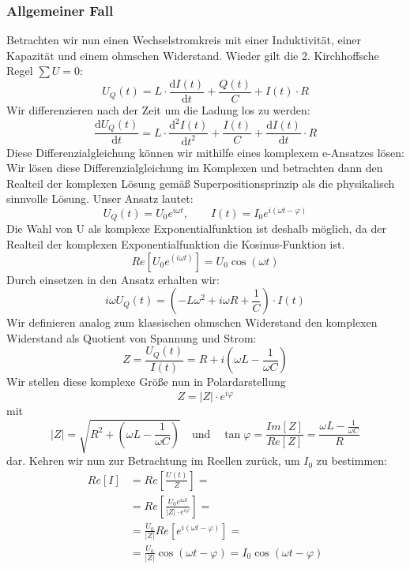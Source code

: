 \subsubsection{Allgemeiner Fall}
Betrachten wir nun einen Wechselstromkreis mit einer Induktivität, einer Kapazität und einem ohmschen Widerstand. Wieder gilt die 2. Kirchhoffsche Regel $\sum U = 0$:
\begin{equation}
U_Q(t) = L \cdot \frac{\mathrm{d}I(t)}{\mathrm{d}t} + \frac{Q(t)}{C} + I(t) \cdot R
\end{equation}
Wir differenzieren nach der Zeit um die Ladung los zu werden:
\begin{equation}
\frac{\mathrm dU_Q(t)}{\mathrm dt} = L \cdot \frac{\mathrm{d^2}I(t)}{\mathrm{d}t^2} + \frac{I(t)}{C} + \frac{\mathrm dI(t)}{\mathrm dt} \cdot R
\end{equation}
Diese Differenzialgleichung können wir mithilfe eines komplexem e-Ansatzes lösen:
Wir lösen diese Differenzialgleichung im Komplexen und betrachten dann den Realteil der komplexen Lösung gemäß Superpositionsprinzip als die physikalisch sinnvolle Lösung. Unser Ansatz lautet:
\begin{equation}
U_Q(t) = U_0 e^{i\omega t},	\qquad	I(t) = I_0 e^{i(\omega t-\varphi)}
\end{equation}
Die Wahl von U als komplexe Exponentialfunktion ist deshalb möglich, da der Realteil der komplexen Exponentialfunktion die Kosinus-Funktion ist.
\begin{equation}
Re\left[ U_0 e^{(i\omega t)}\right]  = U_0 \cos{(\omega t)}
\end{equation}
Durch einsetzen in den Ansatz erhalten wir:
\begin{equation}
i\omega U_Q(t) = (- L \omega^2 + i \omega R  + \frac{1}{C}) \cdot I(t)
\end{equation}
Wir definieren analog zum klassischen ohmschen Widerstand den komplexen Widerstand als Quotient von Spannung und Strom:
\begin{equation}
Z = \frac{U_Q(t)}{I(t)} = R + i ( \omega L - \frac{1}{\omega C})
\end{equation}
Wir stellen diese komplexe Größe nun in Polardarstellung
\begin{equation}
Z = |Z| \cdot e^{i\varphi}
\end{equation}
mit
\begin{equation}\label{Zpolar}
|Z| = \sqrt{ R^2 + \left( \omega L - \frac{1}{\omega C} \right) }\quad {\mathrm{und}} \quad \tan\varphi = \frac{Im[Z]}{Re[Z]} = \frac{\omega L - \frac{1}{\omega C}}{R}
\end{equation}
dar. Kehren wir nun zur Betrachtung im Reellen zurück, um $I_0$ zu bestimmen:
\begin{align}
\nonumber
Re\left[ I \right]
&= Re\left[ \frac{U(t)}{Z} \right] =\\\nonumber
&= Re\left[ \frac{U_0 e^{i\omega t}}{|Z|\cdot e^{i\varphi}} \right] =\\\nonumber
&= \frac{U_0}{|Z|} Re\left[ e^{i(\omega t - \varphi)} \right] =\\
&= \frac{U_0}{|Z|} \cos(\omega t - \varphi) = I_0 \cos(\omega t - \varphi)
\end{align}

